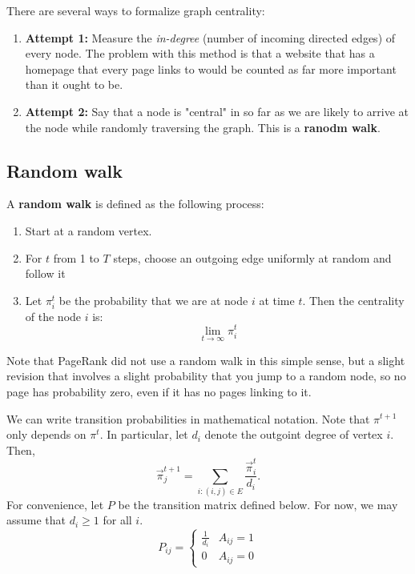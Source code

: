 \documentclass[titlepage, 12pt, leqno]{article}
\begin{document}
There are several ways to formalize graph centrality:
\begin{enumerate}
    \item \textbf{Attempt 1: }Measure the \textit{in-degree} (number of incoming 
        directed edges) of every node. The problem with this method is that a
        website that has a homepage that every page links to would be counted as
        far more important than it ought to be.
    \item \textbf{Attempt 2:} Say that a node is "central" in so far as we are 
        likely to arrive at the node while randomly traversing the graph. This is 
        a \textbf{ranodm walk}.
\end{enumerate}

\subsection{Random walk}
\begin{definition}
    A \textbf{random walk} is defined as the following process:
    \begin{enumerate}
        \item Start at a random vertex.
        \item For $t$ from 1 to $T$ steps, choose an outgoing edge uniformly at
            random and follow it
        \item Let $\pi_{i}^{t}$ be the probability that we are at node $i$ at 
            time $t$. Then the centrality of the node $i$ is:
            \[
                \lim_{t \to \infty} \pi_{i}^{t}
            \]
    \end{enumerate}
\end{definition}

\begin{note}
Note that PageRank did not use a random walk in this simple sense, but a slight
revision that involves a slight probability that you jump to a random node, so 
no page has probability zero, even if it has no pages linking to it.
\end{note}

We can write transition probabilities in mathematical notation. Note that
$\pi^{t+1}$ only depends on $\pi^{t}$. In particular, let $d_{i}$ denote the
outgoint degree of vertex $i$. Then,
\[
    \vec\pi_{j}^{t+1} = \sum_{i:(i,j)\in E}^{}\frac{\vec\pi_{i}^{t}}{d_{i}}.
\]
For convenience, let $P$ be the transition matrix defined below. For now, we may
assume that $d_{i} \ge 1$ for all $i$.
\[
P_{ij} =
\begin{cases}
    \frac{1}{d_{i}} & A_{ij} = 1 \\
    0 & A_{ij} = 0
\end{cases}
\]
\end{document}
